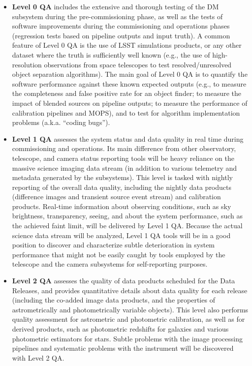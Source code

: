 \documentclass[12pt]{article}
\begin{document}
\begin{itemize}
    \item {\bf Level 0 QA} includes the extensive and thorough testing of the DM subsystem during the pre-commissioning phase, as well as the tests of software improvements during the commissioning and operations phases (regression tests based on pipeline outputs and input truth). A common feature of Level 0 QA is the use of LSST simulations products, or any other dataset where the truth is sufficiently well known (e.g., the use of high-resolution observations from space telescopes to test resolved/unresolved object separation algorithms). The main goal of Level 0 QA is to quantify the software performance against these known expected outputs (e.g., to measure the completeness and false positive rate for an object finder; to measure the impact of blended sources on pipeline outputs; to measure the performance of calibration pipelines and MOPS), and to test for algorithm implementation problems (a.k.a. “coding bugs”).
    
    \item {\bf Level 1 QA} assesses the system status and data quality in real time during commissioning and operations. Its main difference from other observatory, telescope, and camera status reporting tools will be heavy reliance on the massive science imaging data stream (in addition to various telemetry and metadata generated by the subsystems). This level is tasked with nightly reporting of the overall data quality, including the nightly data products (difference images and transient source event stream) and calibration products. Real-time information about observing conditions, such as sky brightness, transparency, seeing, and about the system performance, such as the achieved faint limit, will be delivered by Level 1 QA\@. Because the actual science data stream will be analyzed, Level 1 QA tools will be in a good position to discover and characterize subtle deterioration in system performance that might not be easily caught by tools employed by the telescope and the camera subsystems for self-reporting purposes.

    \item {\bf Level 2 QA} assesses the quality of data products scheduled for the Data Releases, and provides quantitative details about data quality for each release (including the co-added image data products, and the properties of astrometrically and photometrically variable objects). This level also performs quality assessment for astrometric and photometric calibration, as well as for derived products, such as photometric redshifts for galaxies
      and various photometric estimators for stars. Subtle problems with the image processing pipelines and systematic problems with the instrument will be discovered with Level 2 QA.
    

\end{itemize}
\end{document}
